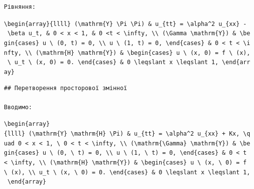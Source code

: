 \documentclass[
  ukrainian,
]{article}
\begin{document}
\begin{verbatim}
Рівняння:
\end{verbatim}

\texttt{\textbackslash{}begin\{array\}\{llll\}\ (\textbackslash{}mathrm\{Y\}\ \textbackslash{}Pi\ \textbackslash{}Pi)\ \&\ u\_\{tt\}\ =\ \textbackslash{}alpha\^{}2\ u\_\{xx\}\ -\ \textbackslash{}beta\ u\_t,\ \&\ 0\ \textless{}\ x\ \textless{}\ 1,\ \&\ 0\ \textless{}t\ \textless{}\ \textbackslash{}infty,\ \textbackslash{}\textbackslash{}\ (\textbackslash{}Gamma\ \textbackslash{}mathrm\{Y\})\ \&\ \textbackslash{}begin\{cases\}\ u\ \textbackslash{}\ (0,\ t)\ =\ 0,\ \textbackslash{}\textbackslash{}\ u\ \textbackslash{}\ (1,\ t)\ =\ 0,\ \textbackslash{}end\{cases\}\ \&\ 0\ \textless{}\ t\ \textless{}\ \textbackslash{}infty,\ \textbackslash{}\textbackslash{}\ (\textbackslash{}mathrm\{H\}\ \textbackslash{}mathrm\{Y\})\ \&\ \textbackslash{}begin\{cases\}\ u\ \textbackslash{}\ (x,\ 0)\ =\ f\ \textbackslash{}\ (x),\ \textbackslash{}\ u\_t\ \textbackslash{}\ (x,\ 0)\ =\ 0.\ \textbackslash{}end\{cases\}\ \&\ 0\ \textbackslash{}leqslant\ x\ \textbackslash{}leqslant\ 1,\ \textbackslash{}end\{array\}}

\begin{verbatim}
## Перетворення просторової змінної

Вводимо:
\end{verbatim}

\texttt{\textbackslash{}begin\{array\}\{llll\}\ (\textbackslash{}mathrm\{Y\}\ \textbackslash{}mathrm\{H\}\ \textbackslash{}Pi)\ \&\ u\_\{tt\}\ =\ \textbackslash{}alpha\^{}2\ u\_\{xx\}\ +\ Kx,\ \textbackslash{}quad\ 0\ \textless{}\ x\ \textless{}\ 1,\ \textbackslash{}\ 0\ \textless{}\ t\ \textless{}\ \textbackslash{}infty,\ \textbackslash{}\textbackslash{}\ (\textbackslash{}mathrm\{\textbackslash{}Gamma\}\ \textbackslash{}mathrm\{Y\})\ \&\ \textbackslash{}begin\{cases\}\ u\ \textbackslash{}\ (0,\ \textbackslash{}\ t)\ =\ 0,\ \textbackslash{}\textbackslash{}\ u\ \textbackslash{}\ (1,\ \textbackslash{}\ t)\ =\ 0,\ \textbackslash{}end\{cases\}\ \&\ 0\ \textless{}\ t\ \textless{}\ \textbackslash{}infty,\ \textbackslash{}\textbackslash{}\ (\textbackslash{}mathrm\{H\}\ \textbackslash{}mathrm\{Y\})\ \&\ \textbackslash{}begin\{cases\}\ u\ \textbackslash{}\ (x,\ \textbackslash{}\ 0)\ =\ f\ \textbackslash{}\ (x),\ \textbackslash{}\textbackslash{}\ u\_t\ \textbackslash{}\ (x,\ \textbackslash{}\ 0)\ =\ 0.\ \textbackslash{}end\{cases\}\ \&\ 0\ \textbackslash{}leqslant\ x\ \textbackslash{}leqslant\ 1,\ \textbackslash{}end\{array\}}
\end{document}
